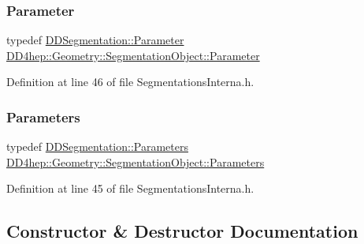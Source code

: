 \subsubsection{\texorpdfstring{Parameter}{Parameter}}
{\footnotesize\ttfamily typedef \hyperlink{namespace_d_d4hep_1_1_d_d_segmentation_af6c6bad2a745d807a0ed00506fb34ccf}{D\+D\+Segmentation\+::\+Parameter} \hyperlink{class_d_d4hep_1_1_geometry_1_1_segmentation_object_a0d017ffe7385b6fe44bf411386cc672b}{D\+D4hep\+::\+Geometry\+::\+Segmentation\+Object\+::\+Parameter}}



Definition at line 46 of file Segmentations\+Interna.\+h.

\hypertarget{class_d_d4hep_1_1_geometry_1_1_segmentation_object_adb4bb039e0cd15ea9fbe0232d07c49cc}{}\label{class_d_d4hep_1_1_geometry_1_1_segmentation_object_adb4bb039e0cd15ea9fbe0232d07c49cc} 
\subsubsection{\texorpdfstring{Parameters}{Parameters}}
{\footnotesize\ttfamily typedef \hyperlink{namespace_d_d4hep_1_1_d_d_segmentation_af38026430ca0e1ef64acdfc898f5dd3d}{D\+D\+Segmentation\+::\+Parameters} \hyperlink{class_d_d4hep_1_1_geometry_1_1_segmentation_object_adb4bb039e0cd15ea9fbe0232d07c49cc}{D\+D4hep\+::\+Geometry\+::\+Segmentation\+Object\+::\+Parameters}}



Definition at line 45 of file Segmentations\+Interna.\+h.



\subsection{Constructor \& Destructor Documentation}
\hypertarget{class_d_d4hep_1_1_geometry_1_1_segmentation_object_a79ddebe4b3ce1664bac66bedff5dc096}{}\label{class_d_d4hep_1_1_geometry_1_1_segmentation_object_a79ddebe4b3ce1664bac66bedff5dc096} 
